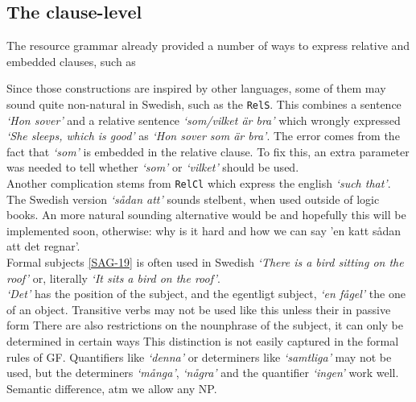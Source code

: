 \documentclass{report}
\begin{document}
\subsection{The clause-level}
The resource grammar already provided a number of ways to express relative and embedded clauses, such as

Since those constructions are inspired by other languages, some of them may sound quite
non-natural in Swedish, such as the \verb|RelS|. This combines a sentence \emph{`Hon sover'}
and a relative sentence \emph{`som/vilket är bra'} which wrongly expressed 
\emph{`She sleeps, which is good'} as
\emph{`Hon sover som är bra'}. The error comes from the fact that \emph{`som'} is
embedded in the relative clause. To fix this, an extra parameter was needed to tell whether
\emph{`som'} or \emph{`vilket'} should be used. \\
Another complication stems from \verb|RelCl| which express the english \emph{`such that'}.
The Swedish version \emph{`sådan att'} sounds stelbent, when used outside of logic books.
An more natural sounding alternative would be
and hopefully this will be implemented soon, otherwise: why is it hard and how we can say
'en katt sådan att det regnar'. \\


Formal subjects \ref{SAG-19} is often used in Swedish
\emph{`There is a bird sitting on the roof'}
or, literally
\emph{`It sits a bird on the roof'}.\\
\emph{`Det'} has the position of the subject, and the egentligt subject, 
\emph{`en fågel'} the one of an object.
Transitive verbs may not be used like this
unless their in passive form
There are also restrictions on the nounphrase of the subject, it can only
be determined in certain ways
This distinction is not easily captured in the formal rules of GF. 
Quantifiers like \emph{`denna'} or determiners like \emph{`samtliga'} may
not be used, but the determiners \emph{`många'}, \emph{`några'} and the quantifier
\emph{`ingen'} work well.
Semantic difference, atm we allow any NP. \\
\end{document}
